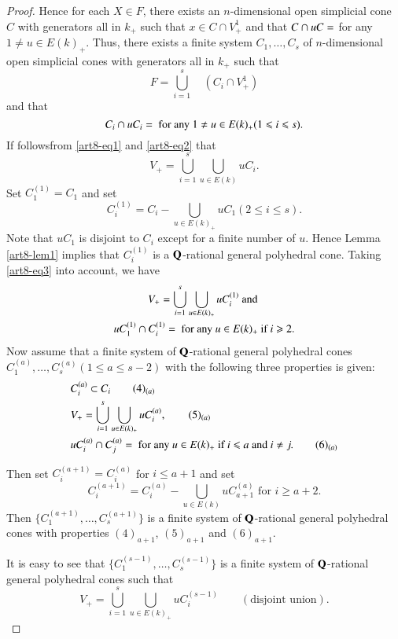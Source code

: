 \begin{proof}
Hence for each $X \in F$, there exists an $n$-dimensional open simplicial cone $C$ with generators all in $k_+$ such that $x \in C \cap V^1_+$ and that $C \cap u C = \empty$ for any $1 \neq u \in E(k)_+$. Thus, there exists a finite system $C_1, \ldots, C_s$ of $n$-dimensional open simplicial cones with generators all in $k_+$ such that 
\begin{equation*}
F = \bigcup\limits^s_{i=1} \quad  (C_i \cap V^1_+) \tag{2}\label{art8-eq2}
\end{equation*}
and that 
\begin{equation*}
C_i \cap u C_i =\empty \text{ for any } 1 \neq u \in E (k)_+ (1 \leqslant i \leqslant s). \label{art8-eq3}
\end{equation*}
If follows\pageoriginale from \eqref{art8-eq1} and \eqref{art8-eq2} that 
$$
V_+ = \bigcup\limits^s_{i=1} \bigcup\limits_{u \in E (k)} u C_i.
$$
Set $C^{(1)}_1 = C_1$ and set
$$
C^{(1)}_i = C_i - \bigcup\limits_{u \in E (k)_+} u C_1 (2 \leqslant i \leqslant s).
$$
Note that $u C_1$ is disjoint to $C_i$ except for a finite number of $u$. Hence Lemma \ref{art8-lem1} implies that $C^{(1)}_i$ is a $\mathbf{Q}$-rational general polyhedral cone. Taking \eqref{art8-eq3} into account, we have
\begin{gather*}
V_+ = \bigcup\limits^s_{i=1} \bigcup\limits_{u \in E(k)_+} uC^{(1)}_i \text{~ and }\\
u C^{(1)}_1 \cap C^{(1)}_i = \empty \text{~ for any ~} u \in E (k)_+ \text{ if } i \geqslant 2.
\end{gather*}
Now assume that a finite system of $\mathbf{Q}$-rational general polyhedral cones $C^{(a)}_1,\ldots, C^{(a)}_s (1 \leqslant a \leqslant s -2)$ with the following three properties is given:
\begin{align*}
& C^{(a)}_i \subset C_i \tag*{(4)$_{(a)}$}\label{art8-eq(4a)}\\
& V_+ =  \bigcup\limits^s_{i=1} \bigcup\limits_{u \in E (k)_+} u C^{(a)}_i, \tag*{(5)$_{(a)}$}\label{art8-eq(5a)}\\
& uC^{(a)}_i \cap C^{(a)}_j = \empty \text{ for any } u \in E (k)_+ \text{ if } i \leqslant a \text{ and } i \neq j. \tag*{(6)$_{(a)}$}\label{art8-eq(6a)}
\end{align*}
 
Then set $C^{(a+1)}_i = C^{(a)}_i$ for $i \leqslant a + 1$ and set
$$
C^{(a+1)}_i = C^{(a)}_i - \bigcup\limits_{u \in E (k)} u C^{(a)}_{a+1} \text{ for } i \geqslant a+2.
$$
Then $\{C^{(a+1)}_1, \ldots, C^{(a+1)}_s\}$ is a finite system of $\mathbf{Q}$-rational general polyhedral cones with properties $(4)_{a+1}$, $(5)_{a+1}$ and $(6)_{a+1}$.

It is easy to see that $\{C^{(s-1)}_1, \ldots, C^{(s-1)}_s\}$ is a finite system of $\mathbf{Q}$-rational general polyhedral cones such that 
$$
V_+ = \bigcup\limits^s_{i=1} \bigcup\limits_{u \in E(k)_+} u C^{(s-1)}_i \qquad (\text{disjoint union}).
$$
\end{proof}

